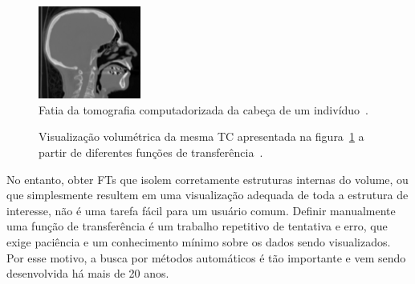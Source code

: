 \begin{figure}[h]
	\centering
	\includegraphics[width=0.3\textwidth]{images/head_ct_slice_intro}
    \caption{Fatia da tomografia computadorizada da cabeça de um indivíduo~\cite{gordonms}.}
    \label{fig:head_ct_slice_intro}
\end{figure}
\begin{figure}[h]
	\centering
    \caption{Visualização volumétrica da mesma TC apresentada na figura~\ref{fig:head_ct_slice_intro} a partir de diferentes funções de transferência~\cite{gordonms}.}
    \label{fig:head_skull_intro}
\end{figure}
    
    No entanto, obter FTs que isolem corretamente estruturas internas do volume, ou que simplesmente resultem em uma visualização adequada de toda a estrutura de interesse, não é uma tarefa fácil para um usuário comum. Definir manualmente uma função de transferência é um trabalho repetitivo de tentativa e erro, que exige paciência e um conhecimento mínimo sobre os dados sendo visualizados. Por esse motivo, a busca por métodos automáticos é tão importante e vem sendo desenvolvida há mais de 20 anos.
    
